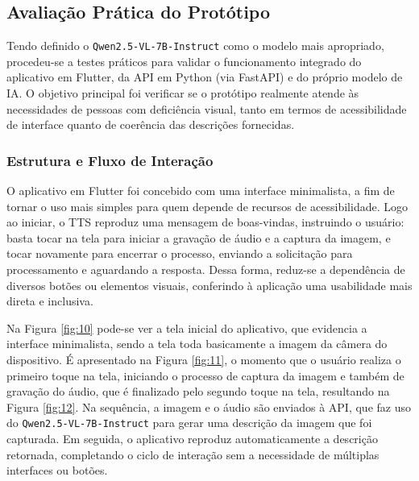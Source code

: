 \subsection{Avaliação Prática do Protótipo}

Tendo definido o \lstinline{Qwen2.5-VL-7B-Instruct} como o modelo mais apropriado, procedeu-se a testes práticos para validar o funcionamento integrado do aplicativo em Flutter, da API em Python (via FastAPI) e do próprio modelo de IA. O objetivo principal foi verificar se o protótipo realmente atende às necessidades de pessoas com deficiência visual, tanto em termos de acessibilidade de interface quanto de coerência das descrições fornecidas.

\subsubsection{Estrutura e Fluxo de Interação}

O aplicativo em Flutter foi concebido com uma interface minimalista, a fim de tornar o uso mais simples para quem depende de recursos de acessibilidade. Logo ao iniciar, o TTS reproduz uma mensagem de boas-vindas, instruindo o usuário: basta tocar na tela para iniciar a gravação de áudio e a captura da imagem, e tocar novamente para encerrar o processo, enviando a solicitação para processamento e aguardando a resposta. Dessa forma, reduz-se a dependência de diversos botões ou elementos visuais, conferindo à aplicação uma usabilidade mais direta e inclusiva.

Na Figura \ref{fig:10} pode-se ver a tela inicial do aplicativo, que evidencia a interface minimalista, sendo a tela toda basicamente a imagem da câmera do dispositivo. É apresentado na Figura \ref{fig:11}, o momento que o usuário realiza o primeiro toque na tela, iniciando o processo de captura da imagem e também de gravação do áudio, que é finalizado pelo segundo toque na tela, resultando na Figura \ref{fig:12}. Na sequência, a imagem e o áudio são enviados à API, que faz uso do \lstinline{Qwen2.5-VL-7B-Instruct} para gerar uma descrição da imagem que foi capturada. Em seguida, o aplicativo reproduz automaticamente a descrição retornada, completando o ciclo de interação sem a necessidade de múltiplas interfaces ou botões.

